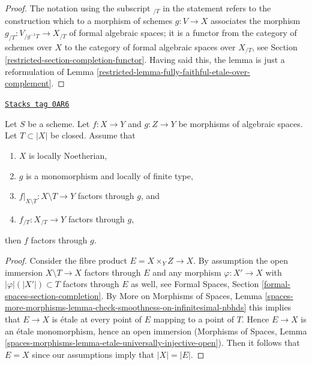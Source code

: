 \begin{proof}

The notation using the subscript ${}_{/T}$ in the statement
refers to the construction which to a morphism of schemes $g : V \to X$
associates the morphism $g_{/T} : V_{/g^{-1}T} \to X_{/T}$ of formal
algebraic spaces; it is a functor from the category of schemes over $X$
to the category of formal algebraic spaces over $X_{/T}$, see
Section \ref{restricted-section-completion-functor}.
Having said this, the lemma is just a reformulation of
Lemma \ref{restricted-lemma-fully-faithful-etale-over-complement}.
\end{proof}

\begin{lemma}[Factor]
\label{restricted-lemma-factor}
\href{https://stacks.math.columbia.edu/tag/0AR6}{\texttt{Stacks tag 0AR6}}

Let $S$ be a scheme. Let $f : X \to Y$ and $g : Z \to Y$ be morphisms
of algebraic spaces. Let $T \subset |X|$ be closed.
Assume that
\begin{enumerate}
\item $X$ is locally Noetherian,
\item $g$ is a monomorphism and locally of finite type,
\item $f|_{X \setminus T} : X \setminus T \to Y$ factors through $g$, and
\item $f_{/T} : X_{/T} \to Y$ factors through $g$,
\end{enumerate}
then $f$ factors through $g$.
\end{lemma}

\begin{proof}
Consider the fibre product $E = X \times_Y Z \to X$.
By assumption the open immersion $X \setminus T \to X$
factors through $E$ and any morphism $\varphi : X' \to X$ with
$|\varphi|(|X'|) \subset T$ factors through $E$ as well, see
Formal Spaces, Section \ref{formal-spaces-section-completion}.
By More on Morphisms of Spaces, Lemma
\ref{spaces-more-morphisms-lemma-check-smoothness-on-infinitesimal-nbhds}
this implies that $E \to X$ is \'etale at every point of $E$
mapping to a point of $T$. Hence $E \to X$ is an \'etale
monomorphism, hence an open immersion
(Morphisms of Spaces, Lemma
\ref{spaces-morphisms-lemma-etale-universally-injective-open}).
Then it follows that $E = X$ since our assumptions imply that $|X| = |E|$.
\end{proof}


